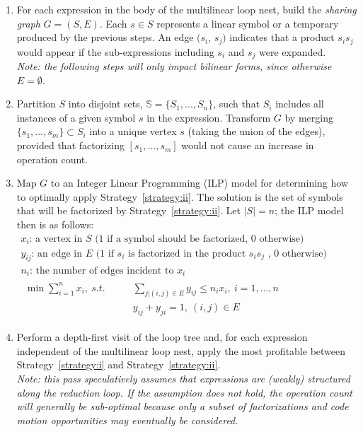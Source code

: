 \begin{Algo}
\begin{enumerate}
\item For each expression in the body of the multilinear loop nest, build the \textit{sharing graph} $G = (S, E)$. Each $s \in S$ represents a linear symbol or a temporary produced by the previous steps. An edge $(s_i$, $s_j)$ indicates that a product $s_i s_j$ would appear if the sub-expressions including $s_i$ and $s_j$ were expanded.\\
\textit{Note: the following steps will only impact bilinear forms, since otherwise $E = \emptyset$.}

\item Partition $S$ into disjoint sets, $\mathbb{S} = \lbrace S_1, ..., S_n\rbrace$, such that $S_i$ includes all instances of a given symbol $s$ in the expression. Transform $G$ by merging $\lbrace s_1, ..., s_m \rbrace \subset S_i$ into a unique vertex $s$ (taking the union of the edges), provided that factorizing $[s_1, ..., s_m]$ would not cause an increase in operation count.

\item Map $G$ to an Integer Linear Programming (ILP) model for determining how to optimally apply Strategy~\ref{strategy:ii}. The solution is the set of symbols that will be factorized by Strategy~\ref{strategy:ii}. Let $|S| = n$; the ILP model then is as follows:
\begin{gather*}
x_i \text{: a vertex in } S \text{ (1 if a symbol should be factorized, 0 otherwise)}\\
y_{ij} \text{: an edge in } E \text{ (1 if } s_i \text{ is factorized in the product } s_i s_j \text{ , 0 otherwise)}\\
n_i \text{: the number of edges incident to } x_i \\
\begin{align*}
\min \sum_{i=1}^{n} x_i,\ s.t. ~~~~~~~~~&\sum_{j|(i,j) \in E} y_{ij} \leq n_i x_i,\ i = 1, ..., n \\
& y_{ij} + y_{ji} = 1,\ (i, j) \in E
\end{align*}
\phantom{\hspace{6cm}}
\end{gather*}


\item Perform a depth-first visit of the loop tree and, for each expression independent of the multilinear loop nest, apply the most profitable between Strategy~\ref{strategy:i} and Strategy~\ref{strategy:ii}. \\
\textit{Note: this pass speculatively assumes that expressions are (weakly) structured along the reduction loop. If the assumption does not hold, the operation count will generally be sub-optimal because only a subset of factorizations and code motion opportunities may eventually be considered.}
\end{enumerate}
\end{Algo}

